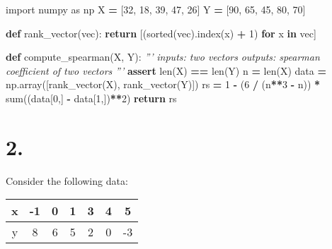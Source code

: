 \documentclass[
]{article}
\newenvironment{Shaded}{\begin{snugshade}}{\end{snugshade}}
\newcommand{\BuiltInTok}[1]{#1}
\newcommand{\CommentTok}[1]{\textcolor[rgb]{0.56,0.35,0.01}{\textit{#1}}}
\newcommand{\ControlFlowTok}[1]{\textcolor[rgb]{0.13,0.29,0.53}{\textbf{#1}}}
\newcommand{\DecValTok}[1]{\textcolor[rgb]{0.00,0.00,0.81}{#1}}
\newcommand{\ImportTok}[1]{#1}
\newcommand{\KeywordTok}[1]{\textcolor[rgb]{0.13,0.29,0.53}{\textbf{#1}}}
\newcommand{\NormalTok}[1]{#1}
\newcommand{\OperatorTok}[1]{\textcolor[rgb]{0.81,0.36,0.00}{\textbf{#1}}}
\begin{document}
\begin{Shaded}
\begin{Highlighting}[]
\ImportTok{import}\NormalTok{ numpy }\ImportTok{as}\NormalTok{ np}
\NormalTok{X }\OperatorTok{=}\NormalTok{ [}\DecValTok{32}\NormalTok{, }\DecValTok{18}\NormalTok{, }\DecValTok{39}\NormalTok{, }\DecValTok{47}\NormalTok{, }\DecValTok{26}\NormalTok{]}
\NormalTok{Y }\OperatorTok{=}\NormalTok{ [}\DecValTok{90}\NormalTok{, }\DecValTok{65}\NormalTok{, }\DecValTok{45}\NormalTok{, }\DecValTok{80}\NormalTok{, }\DecValTok{70}\NormalTok{]}

\KeywordTok{def}\NormalTok{ rank_vector(vec): }
    \ControlFlowTok{return}\NormalTok{ [(}\BuiltInTok{sorted}\NormalTok{(vec).index(x) }\OperatorTok{+} \DecValTok{1}\NormalTok{) }\ControlFlowTok{for}\NormalTok{ x }\KeywordTok{in}\NormalTok{ vec]}
    
\KeywordTok{def}\NormalTok{ compute_spearman(X, Y):}
    \CommentTok{'''}
\CommentTok{    inputs: two vectors}
\CommentTok{    outputs: spearman coefficient of two vectors}
\CommentTok{    '''}
    \ControlFlowTok{assert} \BuiltInTok{len}\NormalTok{(X) }\OperatorTok{==} \BuiltInTok{len}\NormalTok{(Y)}
\NormalTok{    n }\OperatorTok{=} \BuiltInTok{len}\NormalTok{(X)}
\NormalTok{    data }\OperatorTok{=}\NormalTok{ np.array([rank_vector(X), rank_vector(Y)])}
\NormalTok{    rs }\OperatorTok{=} \DecValTok{1} \OperatorTok{-}\NormalTok{ (}\DecValTok{6} \OperatorTok{/}\NormalTok{ (n}\OperatorTok{**}\DecValTok{3} \OperatorTok{-}\NormalTok{ n)) }\OperatorTok{*} \BuiltInTok{sum}\NormalTok{((data[}\DecValTok{0}\NormalTok{,] }\OperatorTok{-}\NormalTok{ data[}\DecValTok{1}\NormalTok{,])}\OperatorTok{**}\DecValTok{2}\NormalTok{)}
    \ControlFlowTok{return}\NormalTok{ rs}
\end{Highlighting}
\end{Shaded}

\hypertarget{section-1}{%
\section{2.}\label{section-1}}

Consider the following data:

\begin{center}
\begin{tabular}{|c|c|c|c|c|c|c|}
\hline
x & -1 & 0 & 1 & 3 & 4 & 5\\
\hline
y & 8 & 6 & 5 & 2 & 0 & -3\\
\hline
\end{tabular}
\end{center}
\end{document}
